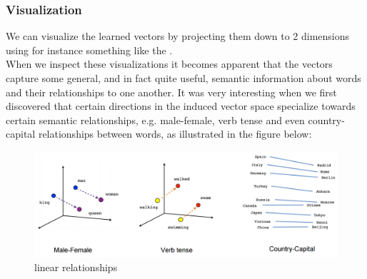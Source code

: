 \subsubsection{Visualization}
\label{visual}
 We can visualize the learned vectors by projecting them down to 2 dimensions using for instance something like the \textcite{t-SNE dimensionality reduction technique}.\\ When we inspect these visualizations it becomes apparent that the vectors capture some general, and in fact quite useful, semantic information about words and their relationships to one another. It was very interesting when we first discovered that certain directions in the induced vector space specialize towards certain semantic relationships, e.g. male-female, verb tense and even country-capital relationships between words, as illustrated in the figure below:
 
  \begin{figure}[H]%
      \center%
        \includegraphics[width=1\textwidth]{images/amira/linear-relationships.png}%
        \caption[linear]{linear relationships}\label{fig:nce-nplm}%
  \end{figure}


